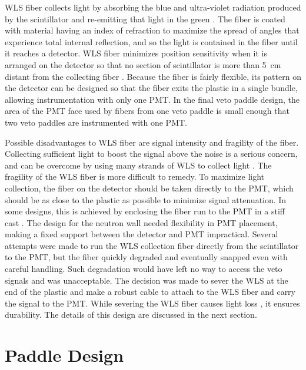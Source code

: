 WLS fiber collects light by absorbing the blue and ultra-violet radiation produced by the scintillator and re-emitting that light in the green \cite{Knoll}.  The fiber is coated with material having an index of refraction to maximize the spread of angles that experience total internal reflection, and so the light is contained in the fiber until it reaches a detector.  WLS fiber minimizes position sensitivity when it is arranged on the detector so that no section of scintillator is more than 5~cm distant from the collecting fiber \cite{Aguillion_scintTiles}.  Because the fiber is fairly flexible, its pattern on the detector can be designed so that the fiber exits the plastic in a single bundle, allowing instrumentation with only one PMT.  In the final veto paddle design, the area of the PMT face used by fibers from one veto paddle is small enough that two veto paddles are instrumented with one PMT.

Possible disadvantages to WLS fiber are signal intensity and fragility of the fiber.  Collecting sufficient light to boost the signal above the noise is a serious concern, and can be overcome by using many strands of WLS to collect light \cite{deBarbaro}.  The fragility of the WLS fiber is more difficult to remedy.  To maximize light collection, the fiber on the detector should be taken directly to the PMT, which should be as close to the plastic as possible to minimize signal attenuation.  In some designs, this is achieved by enclosing the fiber run to the PMT in a stiff cast \cite{GLAST}.  The design for the neutron wall needed flexibility in PMT placement, making a fixed support between the detector and PMT impractical.  Several attempts were made to run the WLS collection fiber directly from the scintillator to the PMT, but the fiber quickly degraded and eventually snapped even with careful handling.  Such degradation would have left no way to access the veto signals and was unacceptable.  The decision was made to sever the WLS at the end of the plastic and make a robust cable to attach to the WLS fiber and carry the signal to the PMT.  While severing the WLS fiber causes light loss \cite{ayotte_surfacePrep}, it ensures durability.  The details of this design are discussed in the next section.  

\section{Paddle Design}

